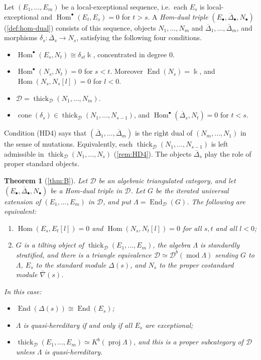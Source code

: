 \documentclass[11pt,reqno]{amsart}
\theoremstyle{plain}
\newtheorem{maintheoreminner}{Theorem}
\newenvironment{maintheorem}[1]{\renewcommand{\themaintheoreminner}{#1}\begin{maintheoreminner}}{\end{maintheoreminner}}
\theoremstyle{definition}
\theoremstyle{remark}
\newcommand{\kk}{\Bbbk}
\DeclareMathOperator{\Hom}{Hom}
\DeclareMathOperator{\End}{End}
\DeclareMathOperator{\cone}{cone}
\newcommand{\modd}{\operatorname{mod}}
\newcommand{\proj}{\operatorname{proj}}
\newcommand{\Db}{\mathcal{D}^b}
\newcommand{\Kb}{K^b}
\newcommand{\thick}[2][\cD]{\operatorname{thick}_{#1}(#2)}
\newcommand{\nablabar}{\overline{\nabla}}
\newcommand{\Deltabar}{\overline{\Delta}}
\newcommand{\cD}{\mathcal{D}}
\begin{document}
Let $(E_1,\dots,E_m)$ be a local-exceptional sequence, i.e.\ each $E_s$ is local-exceptional and $\Hom^\bullet(E_t,E_s)=0$ for $t>s$. A \emph{Hom-dual triple} $(E_\bullet,\Deltabar_\bullet,N_\bullet)$ (\cref{def:hom-dual}) consists of this sequence, objects $N_1,\dots,N_m$ and $\Deltabar_1,\dots,\Deltabar_m$, and morphisms $\delta_s\colon\Deltabar_s\to N_s$, satisfying the following four conditions.
\begin{itemize}
\item[\textup{(HD1)}] $\Hom^\bullet(E_s,N_t)\cong\delta_{st}\kk$, concentrated in degree $0$.
\item[\textup{(HD2)}] $\Hom^\bullet(N_s,N_t)=0$ for $s<t$. Moreover $\End(N_s)=\kk$, and $\Hom(N_s,N_s[l])=0$ for $l<0$.
\item[\textup{(HD3)}] $\cD=\thick{N_1,\dots,N_m}$.
\item[\textup{(HD4)}] $\cone(\delta_s)\in\thick{N_1,\dots,N_{s-1}}$, and $\Hom^\bullet(\Deltabar_s,N_t)=0$ for $t<s$.
\end{itemize}
Condition (HD4) says that $(\Deltabar_1,\dots,\Deltabar_m)$ is the right dual of $(N_m,\dots,N_1)$ in the sense of mutations. Equivalently, each $\thick{N_1,\dots,N_{s-1}}$ is left admissible in $\thick{N_1,\dots,N_s}$ (\cref{rem:HD4}). The objects $\Deltabar_s$ play the role of proper standard objects.

\begin{maintheorem}{B}[\cref{thm:B}]\label{mthm:B}
Let $\cD$ be an algebraic triangulated category, and let $(E_\bullet,\Deltabar_\bullet,N_\bullet)$ be a Hom-dual triple in $\cD$. Let $G$ be the iterated universal extension of $(E_1,\dots,E_m)$ in $\cD$, and put $\Lambda=\End_\cD(G)$. The following are equivalent:
\begin{enumerate}
\item $\Hom(E_s,E_t[l])=0$ and $\Hom(N_s,N_t[l])=0$ for all $s,t$ and all $l<0$;
\item $G$ is a tilting object of $\thick{E_1,\dots,E_m}$, the algebra $\Lambda$ is standardly stratified, and there is a triangle equivalence $\cD\simeq\Db(\modd\Lambda)$ sending $G$ to $\Lambda$, $E_s$ to the standard module $\Delta(s)$, and $N_s$ to the proper costandard module $\nablabar(s)$.
\end{enumerate}
In this case:
\begin{itemize}
\item $\End(\Delta(s))\cong\End(E_s)$;
\item $\Lambda$ is quasi-hereditary if and only if all $E_s$ are exceptional;
\item $\thick{E_1,\dots,E_m}\simeq\Kb(\proj\Lambda)$, and this is a proper subcategory of $\cD$ unless $\Lambda$ is quasi-hereditary.
\end{itemize}
\end{maintheorem}
\end{document}
